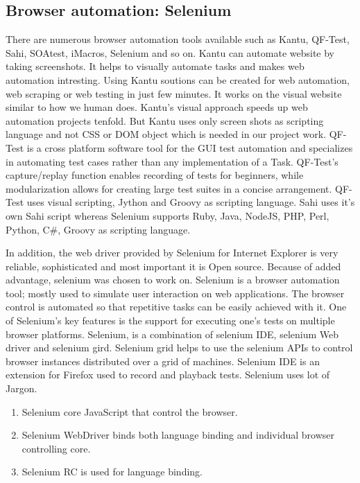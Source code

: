 \documentclass[article,type=msc,colorback,accentcolor=tud9c,twoside,11pt]{tudthesis}
\begin{document}
\subsection{Browser automation: Selenium}
There are numerous browser automation tools available such as Kantu, QF-Test, Sahi, SOAtest, iMacros, Selenium and so on. Kantu can automate website by taking screenshots. It helps to visually automate tasks and makes web automation intresting. Using Kantu soutions can be created for web automation, web scraping or web testing in just few minutes. It works on the visual website similar to how we human does. Kantu's visual approach speeds up web automation projects tenfold. But
 Kantu uses only screen shots as scripting language and not CSS or DOM object which is needed in our project work. QF-Test is a cross platform software tool for the GUI test automation and specializes in automating test cases rather than any implementation of a Task. QF-Test's capture/replay function enables recording of tests for beginners, while modularization allows for creating large test suites in a concise arrangement.  QF-Test uses visual scripting, Jython and Groovy as scripting language. Sahi uses it's own Sahi script whereas Selenium supports Ruby, Java, NodeJS, PHP, Perl, Python, C\#, Groovy as scripting language. 
 
In addition, the web driver provided by Selenium for Internet Explorer is very reliable, sophisticated and most important it is Open source. Because of added advantage, selenium was chosen to work on.
Selenium\cite{AutomationTestingAnIntroductiontoSelenium} is a browser automation tool; mostly used to simulate user interaction on web applications. The browser control is automated so that repetitive tasks can be easily achieved with it. One of Selenium's key features is the support for executing one's tests on multiple browser platforms. Selenium,  is a combination of selenium IDE, selenium Web driver and selenium gird. Selenium grid helps to use the selenium APIs to control browser instances distributed over a grid of machines. Selenium IDE is an extension for Firefox used to record and playback tests. Selenium uses lot of Jargon.

\begin{enumerate}
\item Selenium core JavaScript that control the browser.
\item Selenium WebDriver binds both language binding and individual browser controlling core.
\item Selenium RC is used for language binding.
\end{enumerate}
\end{document}
